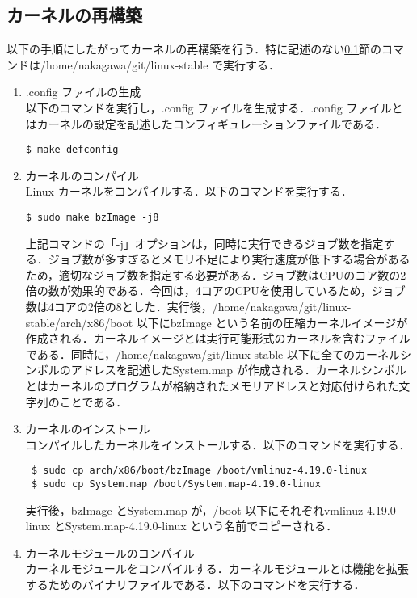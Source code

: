 \documentclass[12pt]{jsarticle}
\begin{document}
  \subsection{カーネルの再構築}\label{sec:saikoutiku}
  以下の手順にしたがってカーネルの再構築を行う．特に記述のない\ref{sec:saikoutiku}節のコマンドは/home/nakagawa/git/linux-stable で実行する．
  \begin{enumerate}
  \item .config ファイルの生成\\
    以下のコマンドを実行し，.config ファイルを生成する．.config ファイルとはカーネルの設定を記述したコンフィギュレーションファイルである．
\begin{verbatim}
$ make defconfig
\end{verbatim}
\item カーネルのコンパイル\\
  Linux カーネルをコンパイルする．以下のコマンドを実行する．
\begin{verbatim}
$ sudo make bzImage -j8
\end{verbatim}
上記コマンドの「-j」オプションは，同時に実行できるジョブ数を指定する．ジョブ数が多すぎるとメモリ不足により実行速度が低下する場合があるため，適切なジョブ数を指定する必要がある．ジョブ数はCPUのコア数の2倍の数が効果的である．今回は，4コアのCPUを使用しているため，ジョブ数は4コアの2倍の8とした．実行後，/home/nakagawa/git/linux-stable/arch/x86/boot 以下にbzImage という名前の圧縮カーネルイメージが作成される．カーネルイメージとは実行可能形式のカーネルを含むファイルである．同時に，/home/nakagawa/git/linux-stable 以下に全てのカーネルシンボルのアドレスを記述したSystem.map が作成される．カーネルシンボルとはカーネルのプログラムが格納されたメモリアドレスと対応付けられた文字列のことである．
\item カーネルのインストール\\
  コンパイルしたカーネルをインストールする．以下のコマンドを実行する．
\begin{verbatim}
 $ sudo cp arch/x86/boot/bzImage /boot/vmlinuz-4.19.0-linux
 $ sudo cp System.map /boot/System.map-4.19.0-linux
\end{verbatim}
実行後，bzImage とSystem.map が，/boot 以下にそれぞれvmlinuz-4.19.0-linux とSystem.map-4.19.0-linux という名前でコピーされる．
\item カーネルモジュールのコンパイル\\
  カーネルモジュールをコンパイルする．カーネルモジュールとは機能を拡張するためのバイナリファイルである．以下のコマンドを実行する．
\begin{verbatim}

\end{verbatim}
\end{enumerate}
\end{document}
